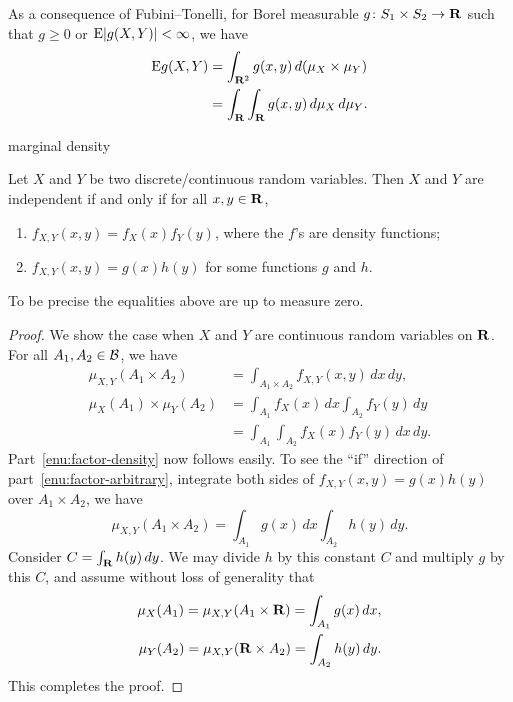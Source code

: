 As a consequence of Fubini--Tonelli, for Borel measurable $g\colon S_1\times S_2 \to \mathbf{R}$ such that $g \geq 0$ or $\mathop{}\!\mathrm{E} \lvert g(X,Y) \rvert < \infty$, we have \begin{align*}
        \mathop{}\!\mathrm{E} g(X,Y) & = \int_{\mathbf{R}^2} g(x,y)\,d(\mu_X \times \mu_Y) \\ & = \int_{\mathbf{R}}\int_{\mathbf{R}} g(x,y)\,d\mu_X \,d \mu_Y.
    \end{align*}


marginal density
\begin{prop}[(Factorization)]
    Let $X$ and $Y$ be two discrete/continuous random variables. Then $X$ and $Y$ are independent if and only if for all $x,y\in \mathbf{R}$,
    \begin{enumerate}
        \item \label{enu:factor-density} $f_{X,Y}(x,y) = f_X(x)f_Y(y)$, where the $f$'s are density functions;
        \item \label{enu:factor-arbitrary} $f_{X,Y}(x,y) = g(x) h(y)$ for some functions $g$ and $h$.
    \end{enumerate} To be precise the equalities above are up to measure zero.
\end{prop}
\begin{proof}
    We show the case when $X$ and $Y$ are continuous random variables on $\mathbf{R}$. For all $A_1,A_2\in \mathcal{B}$, we have \begin{align*}
        \mu_{X,Y}(A_1 \times A_2) & = \int_{A_1 \times A_2} f_{X,Y}(x,y)\,dx\,dy, \\
        \mu_X(A_1) \times \mu_Y(A_2) & = \int_{A_1}f_X(x)\,dx \int_{A_2} f_Y(y)\,dy \\ & = \int_{A_1} \int_{A_2}f_X(x)f_Y(y)\,dx\,dy.
    \end{align*}
    Part~\ref{enu:factor-density} now follows easily. To see the ``if'' direction of part~\ref{enu:factor-arbitrary}, integrate both sides of $f_{X,Y}(x,y) = g(x) h(y)$ over $A_1 \times A_2$, we have \[
        \mu_{X,Y}(A_1 \times A_2) = \int_{A_1} g(x)\,dx \int_{A_2} h(y)\,dy.
    \] Consider $C = \int_{\mathbf{R}} h(y)\,dy$. We may divide $h$ by this constant $C$ and multiply $g$ by this $C$, and assume without loss of generality that \begin{align*}
        \mu_X(A_1) = \mu_{X,Y}(A_1\times \mathbf{R}) = \int_{A_1} g(x)\,dx, \\
        \mu_Y(A_2) = \mu_{X,Y}(\mathbf{R} \times A_2) = \int_{A_2} h(y)\,dy.
    \end{align*} This completes the proof.
\end{proof}

